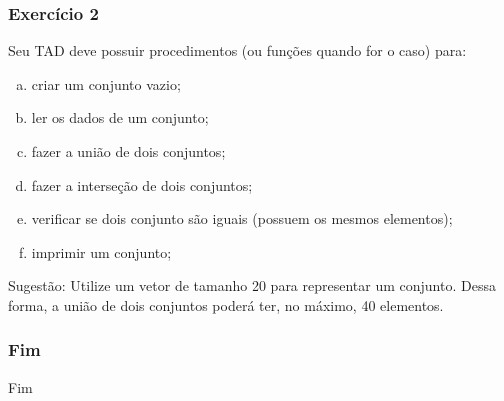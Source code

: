 \documentclass[aspectratio=169]{beamer}
\begin{document}
\begin{frame}
\frametitle{Exercício 2}
Seu TAD deve possuir procedimentos (ou funções quando for o caso) para:
\begin{enumerate}[a)]
 \item criar um conjunto vazio;
 \item ler os dados de um conjunto;
 \item fazer a união de dois conjuntos;
 \item fazer a interseção de dois conjuntos;
 \item verificar se dois conjunto são iguais (possuem os mesmos elementos);
 \item imprimir um conjunto;
\end{enumerate}
Sugestão: Utilize um vetor de tamanho 20 para representar um conjunto. Dessa forma, a união de dois conjuntos poderá ter, no máximo, 40 elementos.
\end{frame}

\begin{frame}
  \frametitle{Fim}
\centering
\huge{Fim}
\end{frame}	
\end{document}
